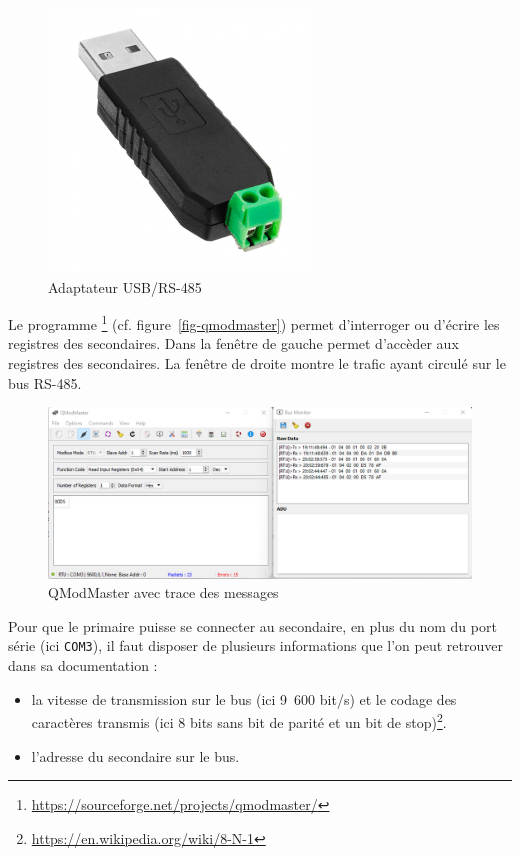 \begin{figure}[tbp]
\centerline{\includegraphics[width=0.3\columnwidth]{Pictures/rs485-usb.png}}
\caption{Adaptateur USB/RS-485}
\label{fig-USBRS485}
\end{figure}

    \vspace{1em}

Le programme \footnote{\url{https://sourceforge.net/projects/qmodmaster/}} (cf. figure~\vref{fig-qmodmaster}) permet d'interroger ou d'écrire les registres des secondaires. Dans la fenêtre de gauche permet d'accèder aux registres des secondaires. La fenêtre de droite montre le trafic ayant circulé sur le bus RS-485.

\begin{figure}[tbp]
\centerline{\includegraphics[width=1\columnwidth]{Pictures/modbus-trace.png}}
\caption{QModMaster avec trace des messages}
\label{fig-qmodmaster}
\end{figure}

Pour que le primaire puisse se connecter au secondaire, en plus du nom du port série (ici \texttt{COM3}), il faut disposer de plusieurs informations que l'on peut retrouver dans sa documentation :

\begin{itemize}
    \item la vitesse de transmission sur le bus (ici 9~600 bit/s) et le codage des caractères transmis (ici 8 bits sans bit de parité et un bit de stop)\footnote{\url{https://en.wikipedia.org/wiki/8-N-1}}.
    \item l'adresse du secondaire sur le bus.
\end{itemize}

